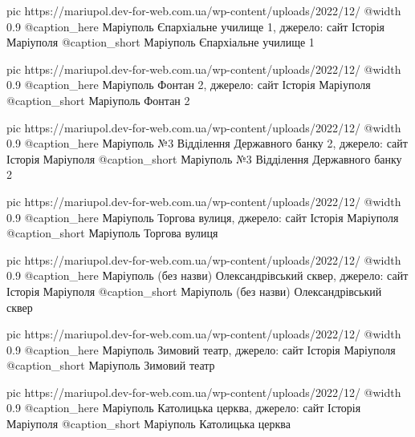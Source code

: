 	pic https://mariupol.dev-for-web.com.ua/wp-content/uploads/2022/12/%
	@width 0.9
	@caption_here Маріуполь Єпархіальне училище 1, джерело: сайт Історія Маріуполя
	@caption_short Маріуполь Єпархіальне училище 1

	pic https://mariupol.dev-for-web.com.ua/wp-content/uploads/2022/12/%
	@width 0.9
	@caption_here Маріуполь Фонтан 2, джерело: сайт Історія Маріуполя
	@caption_short Маріуполь Фонтан 2

	pic https://mariupol.dev-for-web.com.ua/wp-content/uploads/2022/12/%
	@width 0.9
	@caption_here Маріуполь №3 Відділення Державного банку 2, джерело: сайт Історія Маріуполя
	@caption_short Маріуполь №3 Відділення Державного банку 2

	pic https://mariupol.dev-for-web.com.ua/wp-content/uploads/2022/12/%
	@width 0.9
	@caption_here Маріуполь Торгова вулиця, джерело: сайт Історія Маріуполя
	@caption_short Маріуполь Торгова вулиця

	pic https://mariupol.dev-for-web.com.ua/wp-content/uploads/2022/12/%
	@width 0.9
	@caption_here Маріуполь (без назви) Олександрівський сквер, джерело: сайт Історія Маріуполя
	@caption_short Маріуполь (без назви) Олександрівський сквер

	pic https://mariupol.dev-for-web.com.ua/wp-content/uploads/2022/12/%
	@width 0.9
	@caption_here Маріуполь Зимовий театр, джерело: сайт Історія Маріуполя
	@caption_short Маріуполь Зимовий театр

	pic https://mariupol.dev-for-web.com.ua/wp-content/uploads/2022/12/%
	@width 0.9
	@caption_here Маріуполь Католицька церква, джерело: сайт Історія Маріуполя
	@caption_short Маріуполь Католицька церква

